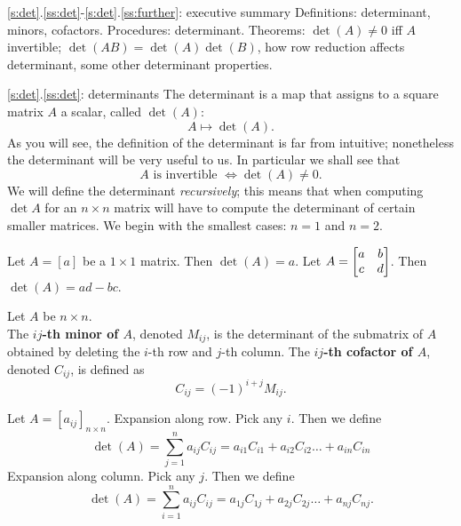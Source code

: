 \begin{frame}{\ref{s:det}.\ref{ss:det}-\ref{s:det}.\ref{ss:further}: executive summary}
\alert{Definitions:} determinant, minors, cofactors.
\bspace
\alert{Procedures:} determinant.
\bspace
\alert{Theorems:} $\det(A)\ne 0$ iff $A$ invertible; $\det(AB)=\det(A)\det(B)$, how row reduction affects determinant, some other determinant properties. 
\end{frame}

\begin{frame}{\ref{s:det}.\ref{ss:det}: determinants}
The \alert{determinant} is a map that assigns to a square matrix $A$ a scalar, called $\det(A)$:
\[
A\mapsto \det(A).
\]
\pause As you will see, the definition of the determinant is far from intuitive; nonetheless the determinant will be very useful to us. In particular we shall see that 
\[
A \text{ is invertible }\Leftrightarrow \det(A)\ne 0.
\]
\pause We will define the determinant {\em recursively}; this means that when computing $\det A$ for an $n\times n$ matrix will have to compute the determinant of certain smaller matrices. We begin with the smallest cases: $n=1$ and $n=2$. 
\begin{definition}
Let $A=[a]$ be a $1\times 1$ matrix. Then $\det(A)=a$. 
\bspace
Let $A=\begin{bmatrix}a&b\\ c&d \end{bmatrix}$. Then $\det(A)=ad-bc$. 
\end{definition} 
\end{frame}
\begin{frame}
\footnotesize
\begin{definition}
Let $A$ be $n\times n$.\\
The {\bf $ij$-th minor of $A$}, denoted $M_{ij}$, is the determinant of the submatrix of $A$ obtained by deleting the $i$-th row and $j$-th column. 
\bpause
The {\bf $ij$-th cofactor of $A$}, denoted $C_{ij}$, is defined as 
\[
C_{ij}=(-1)^{i+j}M_{ij}.
\]
\end{definition}
\pause
\begin{definition}
Let $A=[a_{ij}]_{n\times n}$.
\bpause 
\alert{Expansion along row.} Pick any $i$. Then we define 
\[
\det(A)=\sum_{j=1}^na_{ij}C_{ij}=a_{i1}C_{i1}+a_{i2}C_{i2}\dots +a_{in}C_{in}
\] 
\bpause
\alert{Expansion along column.} Pick any $j$. Then we define 
\[
\det(A)=\sum_{i=1}^na_{ij}C_{ij}=a_{1j}C_{1j}+a_{2j}C_{2j}\dots +a_{nj}C_{nj}.
\] 
\end{definition}
\end{frame}
